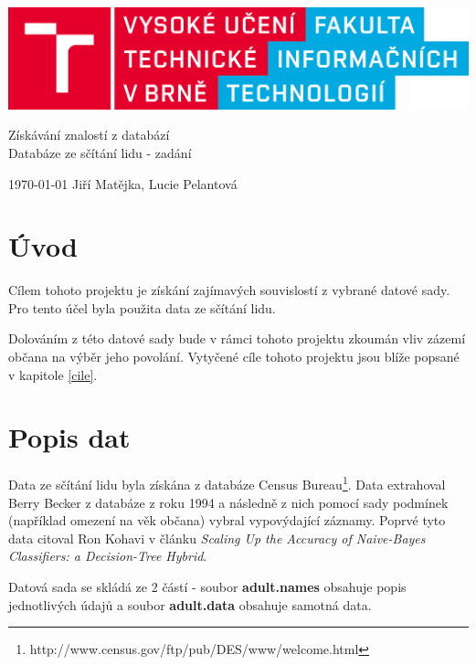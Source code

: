 \documentclass[11pt,a4paper,titlepage]{article}
\begin{document}
		\begin{center}

			\includegraphics[width = 150mm]{logo.png}\\


			\LARGE
			Získávání znalostí z databází\\
			Databáze ze sčítání lidu - zadání\\

		\end{center}

	\Large{\today} \hfill Jiří Matějka, Lucie Pelantová
	\thispagestyle{empty}
	\newpage
	\setcounter{page}{1}

    \section{Úvod}
        Cílem tohoto projektu je získání zajímavých souvislostí z vybrané datové sady. Pro tento 			účel byla použita data ze sčítání lidu.
        
        Dolováním z této datové sady bude v rámci tohoto projektu zkoumán vliv zázemí občana na výběr jeho povolání. Vytyčené cíle tohoto projektu jsou blíže popsané v kapitole \ref{cile}.
    
    \section{Popis dat}
    Data ze sčítání lidu byla získána z databáze Census Bureau\footnote{http://www.census.gov/ftp/pub/DES/www/welcome.html}. Data extrahoval Berry Becker z databáze z roku 1994 a následně z nich pomocí sady podmínek (například omezení na věk občana)  vybral vypovýdající záznamy. Poprvé tyto data citoval Ron Kohavi v článku \textit{Scaling Up the Accuracy of Naive-Bayes Classifiers: a Decision-Tree Hybrid}.
    
        Datová sada se skládá ze 2 částí - soubor \textbf{adult.names} obsahuje popis jednotlivých údajů a soubor \textbf{adult.data} obsahuje samotná data.
    
\end{document}
